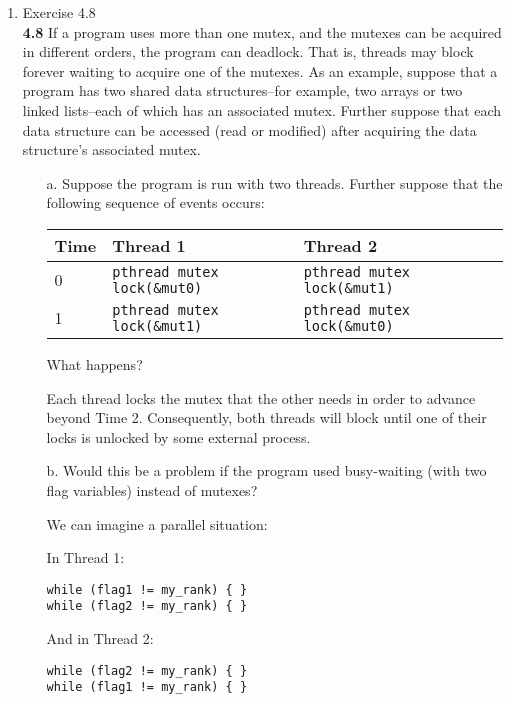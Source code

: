 \documentclass[11pt,epsfig,letterpaper]{article}
\begin{document}
\begin{enumerate}
            \item Exercise 4.8 \\
            {\bf 4.8}\>\> If a program uses more than one mutex, and the mutexes can be acquired in different orders, the program can deadlock. That is, threads may block forever waiting to acquire one of the mutexes. As an example, suppose that a program has two shared data structures–for example, two arrays or two linked lists–each of which has an associated mutex. Further suppose that each data structure can be accessed (read or modified) after acquiring the data structure’s associated mutex.
            \begin{enumerate}

            \item[a.] Suppose the program is run with two threads. Further suppose that the following sequence of events occurs:

            \begin{center}
            \begin{tabular}{| l | l | l | p{10cm} | } \hline
            Time & Thread 1 & Thread 2 \\ \hline
            0 & {\tt pthread mutex lock(\&mut0)} & {\tt pthread mutex lock(\&mut1)} \\ \hline
            1 & {\tt pthread mutex lock(\&mut1)} & {\tt pthread mutex lock(\&mut0)} \\ \hline
            \end{tabular}
            \end{center}

            What happens?

            \quad Each thread locks the mutex that the other needs in order to advance beyond Time 2. Consequently, both threads will block until one of their locks is unlocked by some external process.

            \vspace{0.5pc}
                    \pagebreak
            \item[b.] Would this be a problem if the program used busy-waiting (with two flag variables) instead of mutexes?

            \quad We can imagine a parallel situation:
            \vspace{0.5pc}

                    In Thread 1:
\begin{verbatim}
while (flag1 != my_rank) { }
while (flag2 != my_rank) { }
\end{verbatim}
                    And in Thread 2:
\begin{verbatim}
while (flag2 != my_rank) { }
while (flag1 != my_rank) { }
\end{verbatim}


\end{enumerate}
\end{enumerate}
\end{document}
